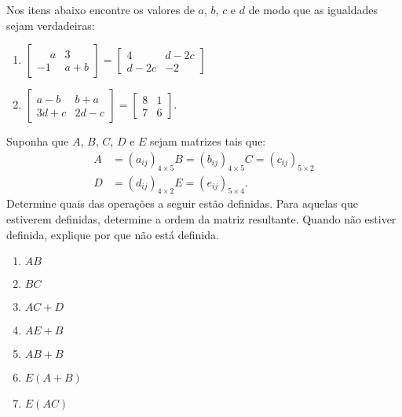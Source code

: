 \documentclass[12pt]{exam}
\begin{document}
\begin{exercicio}
    \label{igualdade_de_matrizes} Nos itens abaixo encontre os valores de $a$, $b$, $c$ e $d$ de modo que as igualdades sejam verdadeiras:
    \begin{enumerate}[label={\alph*})]
        \item $\begin{bmatrix}\phantom{-} a & 3\\-1 & a + b\end{bmatrix} = \begin{bmatrix}4 & d - 2c\\d - 2c & -2\end{bmatrix}$
        \item $\begin{bmatrix}a - b & b + a\\3d + c & 2d - c\end{bmatrix} = \begin{bmatrix}8 & 1\\7 & 6\end{bmatrix}$.
    \end{enumerate}
\end{exercicio}

\begin{exercicio}
    Suponha que $A$, $B$, $C$, $D$ e $E$ sejam matrizes tais que:
    \begin{align*}
        A &= (a_{ij})_{4 \times 5}
        B = (b_{ij})_{4 \times 5}
        C = (c_{ij})_{5 \times 2}\\
        D &= (d_{ij})_{4 \times 2}
        E = (e_{ij})_{5 \times 4}.
    \end{align*}
    Determine quais das operações a seguir estão definidas. Para aquelas que estiverem definidas, determine a ordem da matriz resultante. Quando não estiver definida, explique por que não está definida.
    \begin{multicols}{2}
        \begin{enumerate}[label={\alph*})]
            \item $AB$

            \item $BC$

            \item $AC + D$

            \item $AE + B$

            \item $AB + B$

            \item $E(A + B)$

            \item $E(AC)$

        \end{enumerate}
    \end{multicols}
\end{exercicio}
\end{document}
